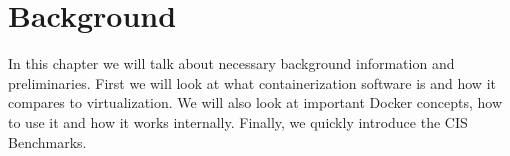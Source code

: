 \chapter{Background}\label{chapter:background}

In this chapter we will talk about necessary background information and preliminaries. First we will look at what containerization software is and how it compares to virtualization. We will also look at important Docker concepts, how to use it and how it works internally. Finally, we quickly introduce the CIS Benchmarks.




